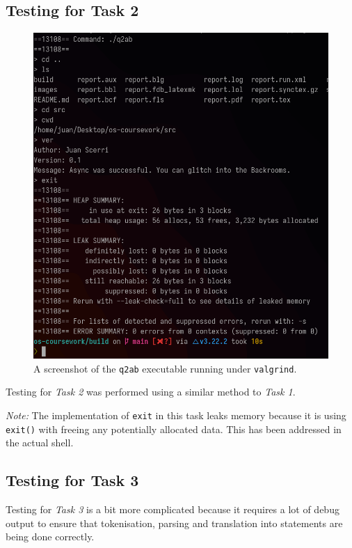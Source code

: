 \documentclass[12pt]{article}
\begin{document}
\subsection{Testing for Task 2}

\begin{figure}[H]
\centering
\includegraphics[width=12cm]{q2ab-test}
\caption{A screenshot of the \texttt{q2ab} executable running
under \texttt{valgrind}.}
\end{figure}

Testing for \textit{Task 2} was performed using a similar method
to \textit{Task 1}.

\textit{Note:} The implementation of \texttt{exit} in this task
leaks memory because it is using \texttt{exit()} with freeing
any potentially allocated data. This has been addressed in the
actual shell.

\subsection{Testing for Task 3}

Testing for \textit{Task 3} is a bit more complicated because it
requires a lot of debug output to ensure that tokenisation,
parsing and translation into statements are being done
correctly.

\newpage
\end{document}

